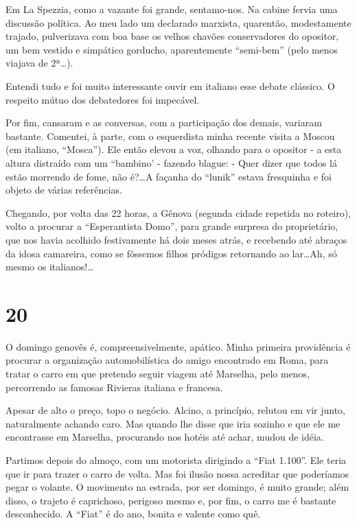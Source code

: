 Em La Spezzia, como a vazante foi grande, sentamo-nos. Na cabine fervia uma discussão política. Ao meu lado um declarado marxista, quarentão, modestamente trajado, pulverizava com boa base os velhos chavões conservadores do opositor, um bem vestido e simpático gorducho, aparentemente “semi-bem” (pelo menos viajava de 2ª\ldots).

Entendi tudo e foi muito interessante ouvir em italiano esse debate clássico. O respeito mútuo dos debatedores foi impecável.

Por fim, cansaram e as conversas, com a participação dos demais, variaram bastante. Comentei, à parte, com o esquerdista minha recente visita a Moscou (em italiano, “Mosca”). Ele então elevou a voz, olhando para o opositor - a esta altura distraído com um “bambino’ - fazendo blague: - Quer dizer que todos lá estão morrendo de fome, não é?\ldots A façanha do “lunik” estava fresquinha e foi objeto de várias referências.

Chegando, por volta das 22 horas, a Gênova (segunda cidade repetida no roteiro), volto a procurar a “Esperantista Domo”, para grande surpresa do proprietário, que nos havia acolhido festivamente há dois meses atrás, e recebendo até abraços da idosa camareira, como se fôssemos filhos pródigos retornando ao lar\ldots Ah, só mesmo os italianos!\ldots

\section*{20 \adfflatleafright {}}
O domingo genovês é, compreensivelmente, apático. Minha primeira providência é procurar a organização automobilística do amigo encontrado em Roma, para tratar o carro em que pretendo seguir viagem até Marselha, pelo menos, percorrendo as famosas Rivieras italiana e francesa.

Apesar de alto o preço, topo o negócio. Alcino, a princípio, relutou em vir junto, naturalmente achando caro. Mas quando lhe disse que iria sozinho e que ele me encontrasse em Marselha, procurando nos hotéis até achar, mudou de idéia.

Partimos depois do almoço, com um motorista dirigindo a “Fiat 1.100”. Ele teria que ir para trazer o carro de volta. Mas foi ilusão nossa acreditar que poderíamos pegar o volante. O movimento na estrada, por ser domingo, é muito grande; além disso, o trajeto é caprichoso, perigoso mesmo e, por fim, o carro me é bastante desconhecido. A “Fiat” é do ano, bonita e valente como quê.

